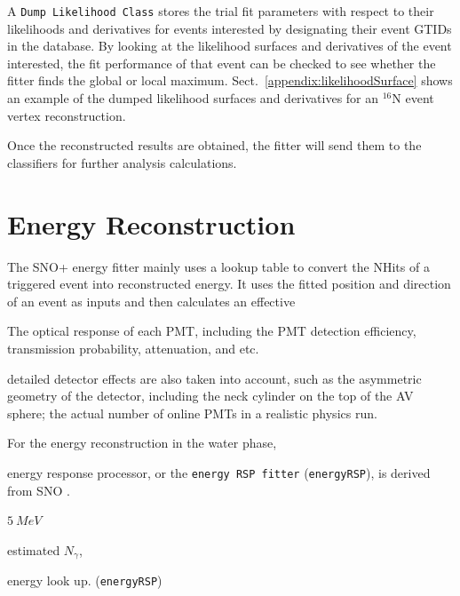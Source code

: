 A \texttt{Dump Likelihood Class} stores the trial fit parameters with respect to their likelihoods and derivatives for events interested by designating their event GTIDs in the database. By looking at the likelihood surfaces and derivatives of the event interested, the fit performance of that event can be checked to see whether the fitter finds the global or local maximum. Sect.~\ref{appendix:likelihoodSurface} shows an example of the dumped likelihood surfaces and derivatives for an $^{16}$N event vertex reconstruction. 

Once the reconstructed results are obtained, the fitter will send them to the classifiers for further analysis calculations. 

\section{Energy Reconstruction}
The SNO+ energy fitter mainly uses a lookup table to convert the NHits of a triggered event into reconstructed energy. It uses the fitted position and direction of an event as inputs and then calculates an effective 

The optical response of each PMT, including the PMT detection efficiency, transmission probability, attenuation, and etc. 

detailed detector effects are also taken into account, such as the asymmetric geometry of the detector, including the neck cylinder on the top of the AV sphere; the actual number of online PMTs in a realistic physics run.

For the energy reconstruction in the water phase,  

energy response processor, or the \texttt{energy RSP fitter} (\texttt{energyRSP}), is derived from SNO \cite{boulay2004direct,moffat2001optical}.

$5~MeV$

estimated $N_\gamma$,

energy look up\cite{energyRSP}.
(\texttt{energyRSP})

%	
%	


